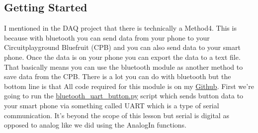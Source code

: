 \subsection{Getting Started}

I mentioned in the DAQ project that there is technically a
Method4. This is because with bluetooth you can send data from your
phone to your Circuitplayground Bluefruit
(CPB) and you can also send data to your smart phone. Once
the data is on your phone you can export the data to a text file. That
basically means you can use the bluetooth module as another method to
save data from the CPB. There is a lot you can do 
with bluetooth but the bottom line is that  All
code required for this module is on
my \href{https://github.com/cmontalvo251/Microcontrollers/tree/master/Circuit_Playground/CircuitPython/CPB_DataLogger}{Github}. First we're going to run
the \href{https://github.com/cmontalvo251/Microcontrollers/blob/master/Circuit_Playground/CircuitPython/CPB_DataLogger/bluefruit_uart_button.py}{bluetooth\_uart\_button.py}
script which sends button data to your smart phone via something called UART
which is a type of serial communication. It's beyond the scope of this
lesson but serial is digital as opposed to analog like we did using
the AnalogIn functions. 


